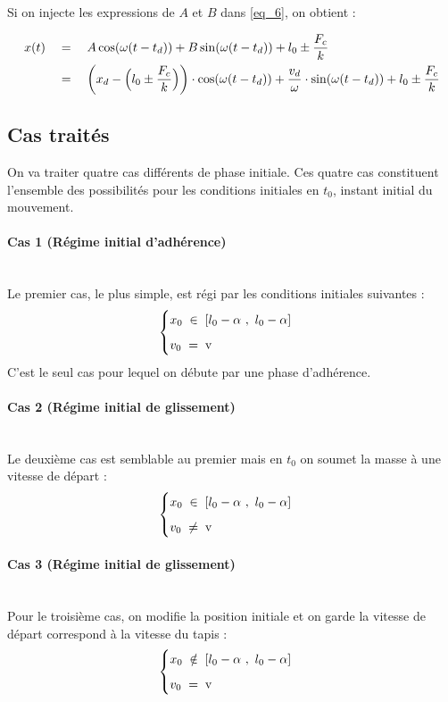 \documentclass{article}
\begin{document}
Si on injecte les expressions de $A$ et $B$ dans \eqref{eq_6}, on obtient :

\begin{align}
	x(t) \quad&=\quad A\cos(\omega (t-t_d))+B\sin(\omega (t-t_d))+ l_0 \pm \dfrac{F_c}{k} \nonumber \\
	&= \quad\left(x_d - \Big{(}l_0 \pm \dfrac{F_c}{k}\Big{)}\right)\cdot\cos(\omega (t-t_d)) +\dfrac{v_d}{\omega}\cdot\sin(\omega (t-t_d)) + l_0 \pm \dfrac{F_c}{k}\addtocounter{equation}{2} \label{eq_7}
\end{align}

\subsection{Cas traités}\label{ssec_1.2}
On va traiter quatre cas différents de phase initiale. Ces quatre cas constituent l'ensemble des possibilités pour les conditions initiales en $t_0$, instant initial du mouvement.  
\paragraph{Cas 1 (Régime initial d'adhérence)}\label{par_1.2.0.1}
\mbox{}\\
Le premier cas, le plus simple, est régi par les conditions initiales suivantes :
$$
\begin{cases}
	\vspace{.2cm}
	x_0\;\in\; [l_0-\alpha~,~l_0-\alpha]\\
	v_0 \;=\; \text{v}
\end{cases}
$$
C'est le seul cas pour lequel on débute par une phase d'adhérence. 

\paragraph{Cas 2 (Régime initial de glissement)}\label{par_1.2.0.2}
\mbox{}\\
Le deuxième cas est semblable au premier mais en $t_0$ on soumet la masse à une vitesse de départ :
$$
\begin{cases}
	\vspace{.2cm}
	x_0 \;\in\; [l_0-\alpha~,~l_0-\alpha]\\
	v_0\;\neq\; \text{v}
\end{cases}
$$

\paragraph{Cas 3 (Régime initial de glissement)}\label{par_1.2.0.3}
\mbox{}\\
Pour le troisième cas, on modifie la position initiale et on garde la vitesse de départ correspond à la vitesse du tapis :
$$
\begin{cases}
	\vspace{.2cm}
	x_0 \;\notin\; [l_0-\alpha~,~l_0-\alpha]\\
	v_0\;=\; \text{v}
\end{cases}
$$
\end{document}
